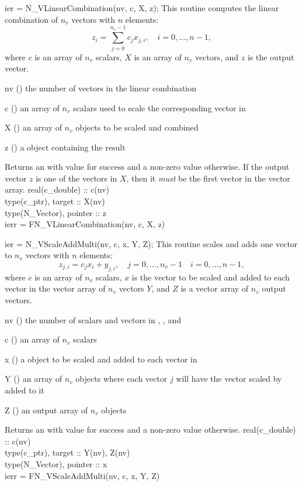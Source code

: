 {
  ier = N\_VLinearCombination(nv, c, X, z);
}
{
  This routine computes the linear combination of $n_v$ vectors with $n$
  elements:
  \begin{equation*}
    z_i = \sum_{j=0}^{n_v-1} c_j x_{j,i}, \quad i=0,\ldots,n-1,
  \end{equation*}
  where $c$ is an array of $n_v$ scalars, $X$ is an array of $n_v$ vectors,
  and $z$ is the output vector.
}
{
  \begin{args}[nv]
  \item[nv] () the number of vectors in the linear combination
  \item[c] () an array of $n_v$ scalars used to scale
    the corresponding vector in 
  \item[X] () an array of $n_v$ {\nvector} objects
    to be scaled and combined
  \item[z] () a {\nvector} object containing the result
  \end{args}
}
{
  Returns an  with value  for success and a non-zero value otherwise.
}
{
  If the output vector $z$ is one of the vectors in $X$, then it \textit{must} be
  the first vector in the vector array.
}
{
  real(c\_double) :: c(nv)\\
  type(c\_ptr), target :: X(nv)\\
  type(N\_Vector), pointer :: z\\
  ierr = FN\_VLinearCombination(nv, c, X, z)
}

{
  ier = N\_VScaleAddMulti(nv, c, x, Y, Z);
}
{
  This routine scales and adds one vector to $n_v$ vectors with $n$ elements:
  \begin{equation*}
    z_{j,i} = c_j x_i + y_{j,i}, \quad j=0,\ldots,n_v-1 \quad i=0,\ldots,n-1,
  \end{equation*}
  where $c$ is an array of $n_v$ scalars, $x$ is the vector to be scaled and
  added to each vector in the vector array of $n_v$ vectors $Y$, and $Z$ is a
  vector array of $n_v$ output vectors.
}
{
  \begin{args}[nv]
  \item[nv] () the number of scalars and vectors in , , and 
  \item[c] () an array of $n_v$ scalars
  \item[x] () a {\nvector} object to be scaled and added to each
    vector in 
  \item[Y] () an array of $n_v$ {\nvector} objects where each vector
    $j$ will have the vector  scaled by  added to it
  \item[Z] () an output array of $n_v$ {\nvector} objects
  \end{args}
}
{
  Returns an  with value  for success and a non-zero value otherwise.
}
{}
{
  real(c\_double) :: c(nv)\\
  type(c\_ptr), target :: Y(nv), Z(nv)\\
  type(N\_Vector), pointer :: x\\
  ierr = FN\_VScaleAddMulti(nv, c, x, Y, Z)
}

